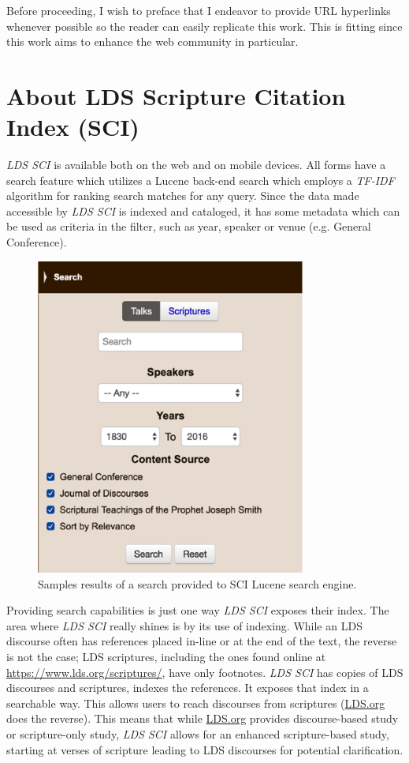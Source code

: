 Before proceeding, I wish to preface that I endeavor to provide URL hyperlinks whenever possible so the reader can easily replicate this work. This is fitting since this work aims to enhance the web community in particular.

\section{About LDS Scripture Citation Index (SCI)}
\emph{LDS SCI} is available both on the web and on mobile devices. All forms have a search feature which utilizes a Lucene \citep{lucene:luke} back-end search which employs a \emph{TF-IDF} algorithm for ranking search matches for any query. Since the data made accessible by \emph{LDS SCI} is indexed and cataloged, it has some metadata which can be used as criteria in the filter, such as year, speaker or venue (e.g. General Conference).

\begin{figure}[hhhhhtb]
	\centering
		\includegraphics[width=3.5in,natwidth=310,natheight=442]{figures/sci_search.png}
		\caption[SCI \emph{TF-IDF} Search Results]{
			Samples results of a search provided to SCI Lucene search engine.
		}
	\label{fig:sci_search}
\end{figure}

Providing search capabilities is just one way \emph{LDS SCI} exposes their index. The area where \emph{LDS SCI} really shines is by its use of indexing. While an LDS discourse often has references placed in-line or at the end of the text, the reverse is not the case; LDS scriptures, including the ones found online at \url{https://www.lds.org/scriptures/}, have only footnotes. \emph{LDS SCI} has copies of LDS discourses and scriptures, indexes the references. It exposes that index in a searchable way. This allows users to reach discourses from scriptures (\url{LDS.org} does the reverse). This means that while \url{LDS.org} provides discourse-based study or scripture-only study, \emph{LDS SCI} allows for an enhanced scripture-based study, starting at verses of scripture leading to LDS discourses for potential clarification.

